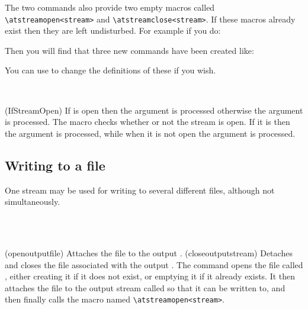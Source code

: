 {{{{    The two  commands also provide two empty macros called
\verb?\atstreamopen<stream>? and \verb?\atstreamclose<stream>?. 
If these macros already exist then they are left undisturbed. 
For example if you do:
\begin{lcode}
\newcommand{\atstreamopenmyout}{...}
\end{lcode}
Then you will find that three new commands have been created like:
\begin{lcode}
\newcommand{\atstreamclosemyout}{}
\newcommand{\atstreamopenmyin}{}
\newcommand{\atstreamclosemyin}{}
\end{lcode}
You can use \cmd{\renewcommand} to change the definitions of these if you
wish.

\begin{syntax}
\cmd{\IfStreamOpen} \\
\end{syntax}
\glossary(IfStreamOpen)%
  {}%
  {If  is open then the  argument is processed
   otherwise the  argument is processed.}
The macro \cmd{\IfStreamOpen} checks whether or not the 
stream is open. If it is then 
the  argument is processed,
while when it is not open the  argument is processed.

\subsection{Writing to a file}


    One stream may be used for writing to several different files, although not
simultaneously.

\begin{syntax}
\cmd{\openoutputfile} \\
\cmd{\closeoutputstream} \\
\end{syntax}
\glossary(openoutputfile)%
  {}%
  {Attaches the file  to the output .}
\glossary(closeoutputstream)%
  {}%
  {Detaches and closes the file associated with the output .}
The command \cmd{\openoutputfile} opens the file 
called ,
either creating it if it does not exist, or emptying it if it already exists.
It then attaches the file to the output 
stream called  so that
it can be written to, and then finally calls the macro 
named \verb?\atstreamopen<stream>?. 

}}}}
